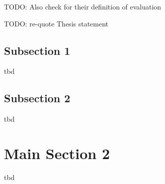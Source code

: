 TODO: Also check \cite{Peffers2012} for their definition of evaluation

TODO: re-quote Thesis statement



\subsection{Subsection 1}

tbd



\subsection{Subsection 2}

tbd



\section{Main Section 2}

tbd